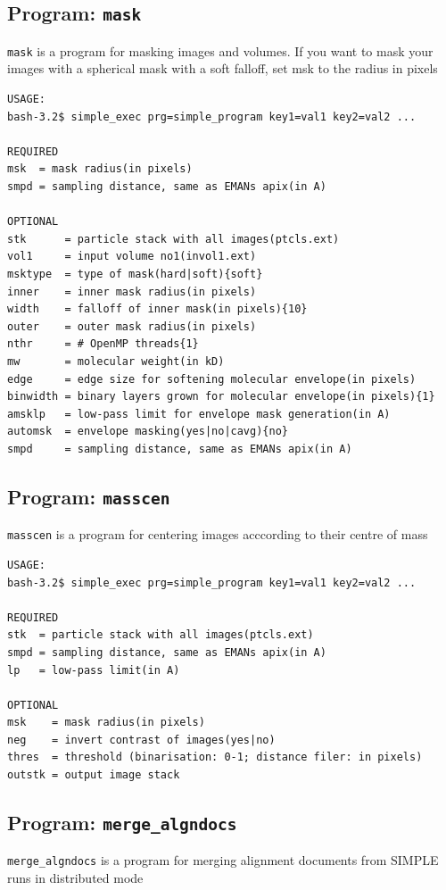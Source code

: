 \documentclass[a4paper,11pt]{article}
\newcommand{\prgname}[1]{\textcolor{NavyBlue}{\texttt{#1}}}
\begin{document}
\subsection{Program: \prgname{mask}}
\label{mask}
\prgname{mask} is a program for masking images and volumes. If you want to mask your images with a spherical mask with a soft falloff, set msk to the radius in pixels

\begin{verbatim}
USAGE:
bash-3.2$ simple_exec prg=simple_program key1=val1 key2=val2 ...

REQUIRED
msk  = mask radius(in pixels)
smpd = sampling distance, same as EMANs apix(in A)

OPTIONAL
stk      = particle stack with all images(ptcls.ext)
vol1     = input volume no1(invol1.ext)
msktype  = type of mask(hard|soft){soft}
inner    = inner mask radius(in pixels)
width    = falloff of inner mask(in pixels){10}
outer    = outer mask radius(in pixels)
nthr     = # OpenMP threads{1}
mw       = molecular weight(in kD)
edge     = edge size for softening molecular envelope(in pixels)
binwidth = binary layers grown for molecular envelope(in pixels){1}
amsklp   = low-pass limit for envelope mask generation(in A)
automsk  = envelope masking(yes|no|cavg){no}
smpd     = sampling distance, same as EMANs apix(in A)
\end{verbatim}

\subsection{Program: \prgname{masscen}}
\label{masscen}
\prgname{masscen} is a program for centering images acccording to their centre of mass

\begin{verbatim}
USAGE:
bash-3.2$ simple_exec prg=simple_program key1=val1 key2=val2 ...

REQUIRED
stk  = particle stack with all images(ptcls.ext)
smpd = sampling distance, same as EMANs apix(in A)
lp   = low-pass limit(in A)

OPTIONAL
msk    = mask radius(in pixels)
neg    = invert contrast of images(yes|no)
thres  = threshold (binarisation: 0-1; distance filer: in pixels)
outstk = output image stack
\end{verbatim}

\subsection{Program: \prgname{merge\_algndocs}}
\label{merge_algndocs}
\prgname{merge\_algndocs} is a program for merging alignment documents from SIMPLE runs in distributed mode
\end{document}
